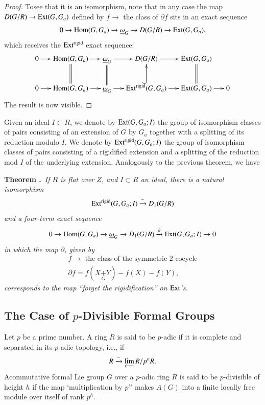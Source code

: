 \begin{proof}
To\pageoriginale see that it is an isomorphism, note that in any case the map $D(G/R)\to \operatorname{Ext}(G,G_{a})$ defined by $f\to$ the class of $\partial f$ sits in an exact sequence
$$
0\to \operatorname{Hom}(G,G_{a})\to \underline{\omega}_{G}\to D(G/R)\to \operatorname{Ext}(G,G_{a}),
$$
which receives the $\operatorname{Ext}^{\text{rigid}}$ exact sequence:
\[
\xymatrix@C=.5cm{
0\ar[r] & \Hom(G,G_{a})\ar@{=}[d]\ar[r] & \underline{\omega}_{G}\ar@{=}[d]\ar[r] & D(G/R)\ar[r] & \Ext(G,G_{a})\ar@{=}[d] &\\
0\ar[r] & \Hom(G,G_{a})\ar[r] & \underline{\omega}_{G}\ar[r] & \Ext^{\text{rigid}}(G,G_{a})\ar@{^(->}[u]\ar[r] & \Ext(G,G_{a})\ar[r] & 0
}
\]
The result is now visible.
\end{proof}

Given an ideal $I\subset R$, we denote by $\operatorname{Ext}(G,G_{a};I)$ the group of isomorphism classes of pairs consisting of an extension of $G$ by $G_{a}$ together with a splitting of its reduction modulo $I$. We denote by $\operatorname{Ext}^{\text{rigid}}(G,G_{a};I)$ the group of isomorphism classes of pairs consisting of a rigidified extension and a splitting of the reduction mod $I$ of the underlying extension. Analogously to the previous theorem, we have

\medskip
\noindent
{\bf Theorem .\label{art6-thm5.2.2}}~{\em If $R$ is flat over $Z$, and $I\subset R$ an ideal, there is a natural isomorphism}
$$
\operatorname{Ext}^{\text{rigid}}(G,G_{a};I)\xrightarrow{\sim}D_{1}(G/R)
$$
{\em and a four-term exact sequence}
$$
0\to \operatorname{Hom}(G,G_{a})\to \underline{\omega}_{G}\to D_{1}(G/R)\xrightarrow{\partial}\operatorname{Ext}(G,G_{a};I)\to 0
$$
{\em in which the map $\partial$, given by}
\begin{gather*}
f\to \text{~the class of the symmetric 2-cocycle}\\[3pt]
\partial f=f(X{\displaystyle{\mathop{+}\limits_{G}}}Y)-f(X)-f(Y),
\end{gather*}
{\em corresponds to the map ``forget the rigidification'' on $\operatorname{Ext}$'s.}

\subsection{The Case of $p$-Divisible Formal Groups}\label{art6-sec5.3}
Let $p$ be a prime number. A ring $R$ is said to be $p$-adic if it is complete and separated in its $p$-adic topology, i.e., if
$$
R\xrightarrow{\sim} \varprojlim R/p^{n}R.
$$
A\pageoriginale commutative formal Lie group $G$ over a $p$-adic ring $R$ is said to be $p$-divisible of height $h$ if the map `multiplication by $p$'' makes $A(G)$ into a finite locally free module over itself of rank $p^{h}$.

